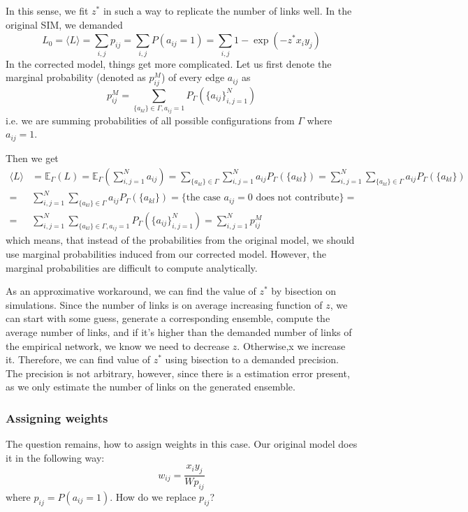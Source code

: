 In this sense, we fit $z^*$ in such a way to replicate the number of links well. In the original SIM, we demanded
\begin{equation}
    L_0 = \langle L \rangle = \sum_{i,j} p_{ij} = \sum_{i,j} P(a_{ij} = 1) = \sum_{i,j} 1-\exp{(-z^*x_iy_j)}
\end{equation}
In the corrected model, things get more complicated. 
Let us first denote the marginal probability (denoted as $p_{ij}^M$) of every edge $a_{ij}$ as
\begin{equation}
    p_{ij}^M = \sum_{\{a_{kl}\} \in \Gamma, a_{ij} = 1} P_\Gamma\left(\{a_{ij}\}_{i,j=1}^N\right)
\end{equation}
i.e. we are summing probabilities of all possible configurations from $\Gamma$ where $a_{ij} = 1$. 

Then we get
\begin{align}
    \langle L \rangle &= \mathbb{E}_\Gamma\left(L\right) = \mathbb{E}_\Gamma\left(\sum_{i,j=1}^{N} a_{ij}\right) = \sum_{\{a_{kl}\} \in \Gamma} \sum_{i,j=1}^{N} a_{ij} P_\Gamma\left(\{a_{kl}\}\right) = \sum_{i,j=1}^{N} \sum_{\{a_{kl}\} \in \Gamma} a_{ij} P_\Gamma\left(\{a_{kl}\}\right)\\
    =&  \sum_{i,j=1}^{N} \sum_{\{a_{kl}\} \in \Gamma} a_{ij} P_\Gamma\left(\{a_{kl}\}\right) = \text{\{the case $a_{ij} = 0$ does not contribute\}} = \\
    =& \sum_{i,j=1}^{N} \sum_{\{a_{kl}\} \in \Gamma, a_{ij} = 1} P_\Gamma\left(\{a_{ij}\}_{i,j=1}^N\right) = \sum_{i,j=1}^{N} p_{ij}^M
\end{align}
which means, that instead of the probabilities from the original model, we should use marginal probabilities induced from our corrected model. However, the marginal probabilities are difficult to compute analytically. 

As an approximative workaround, we can find the value of $z^*$ by bisection on simulations. Since the number of links is on average increasing function of $z$, we can start with some guess, generate a corresponding ensemble, compute the average number of links, and if it's higher than the demanded number of links of the empirical network, we know we need to decrease $z$. Otherwise,x we increase it. Therefore, we can find value of $z^*$ using bisection to a demanded precision. The precision is not arbitrary, however, since there is a estimation error present, as we only estimate the number of links on the generated ensemble.

\subsubsection{Assigning weights}
The question remains, how to assign weights in this case. Our original model does it in the following way:
\begin{equation}
    w_{ij} = \frac{x_iy_j}{Wp_{ij}}
\end{equation}
where $p_{ij} = P(a_{ij} = 1)$. How do we replace $p_{ij}$?

